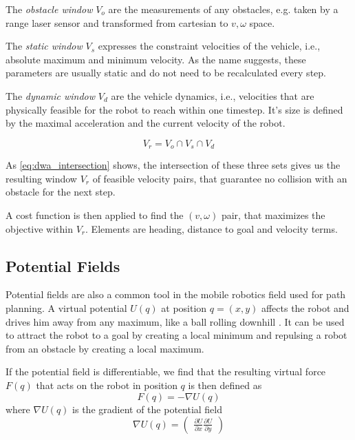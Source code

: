 The \emph{obstacle window} $V_o$ are the measurements of any obstacles, e.g. taken by a range laser sensor and transformed from cartesian to $v,\omega$ space.

The \emph{static window} $V_s$ expresses the constraint velocities of the vehicle, i.e., absolute maximum and minimum velocity. As the name suggests, these parameters are usually static and do not need to be recalculated every step.

The \emph{dynamic window} $V_d$ are the vehicle dynamics, i.e., velocities that are physically feasible for the robot to reach within one timestep. It's size is defined by the maximal acceleration and the current velocity of the robot.

\begin{equation}
V_r = V_o \cap V_s \cap V_d
 	\label{eq:dwa_intersection}
\end{equation}

As \cref{eq:dwa_intersection} shows, the intersection of these three sets gives us the resulting window $V_r$ of feasible velocity pairs, that guarantee no collision with an obstacle for the next step.

A cost function is then applied to find the $(v,\omega)$ pair, that maximizes the objective within $V_r$. Elements are heading, distance to goal and velocity terms.

\subsection{Potential Fields}
Potential fields are also a common tool in the mobile robotics field used for path planning. A virtual potential $U(q)$ at position $q = (x,y)$ affects the robot and drives him away from any maximum, like a ball rolling downhill \citep{siegwart2004autonomous}. It can be used to attract the robot to a goal by creating a local minimum and repulsing a robot from an obstacle by creating a local maximum.

If the potential field is differentiable, we find that the resulting virtual force $F(q)$ that acts on the robot in position $q$ is then defined as 
\begin{equation}
F(q) = - \nabla U(q) 
	\label{eq:pot_force}
\end{equation}
where $\nabla U(q)$ is the gradient of the potential field
\begin{equation}
\nabla U(q) = \begin{pmatrix}
\frac{\partial U}{\partial x}
\frac{\partial U}{\partial y}
\end{pmatrix}
\end{equation}


